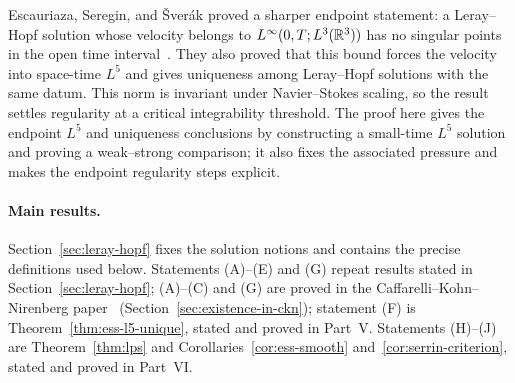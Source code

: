 \documentclass[11pt,letterpaper]{article}
\numberwithin{equation}{section}
\theoremstyle{plain}
\theoremstyle{definition}
\theoremstyle{remark}
\begin{document}
Escauriaza, Seregin, and \v{S}ver\'ak proved a sharper endpoint statement: a Leray--Hopf solution whose velocity belongs to $L^\infty(0,T;L^3(\mathbb{R}^3))$ has no singular points in the open time interval~\cite[Theorems~1.3--1.4]{ESS2003}. They also proved that this bound forces the velocity into space-time $L^5$ and gives uniqueness among Leray--Hopf solutions with the same datum. This norm is invariant under Navier--Stokes scaling, so the result settles regularity at a critical integrability threshold. The proof here gives the endpoint $L^5$ and uniqueness conclusions by constructing a small-time $L^5$ solution and proving a weak--strong comparison; it also fixes the associated pressure and makes the endpoint regularity steps explicit.

\paragraph{Main results.}
Section~\ref{sec:leray-hopf} fixes the solution notions and contains the precise definitions used below. Statements (A)--(E) and (G) repeat results stated in Section~\ref{sec:leray-hopf}; (A)--(C) and (G) are proved in the Caffarelli--Kohn--Nirenberg paper~\cite{CKNLean} (Section~\ref{sec:existence-in-ckn}); statement (F) is Theorem~\ref{thm:ess-l5-unique}, stated and proved in Part~V. Statements (H)--(J) are Theorem~\ref{thm:lps} and Corollaries~\ref{cor:ess-smooth} and~\ref{cor:serrin-criterion}, stated and proved in Part~VI.
\end{document}
